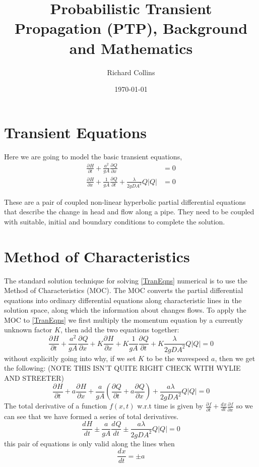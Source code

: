 \documentclass[]{article}
\date{\today}
\title{Probabilistic Transient Propagation (PTP), Background and Mathematics}
\author{Richard Collins}
\providecommand{\diff}[3]{\frac{d^{#3} #1}{d #2^{#3}}}
\providecommand{\pdiff}[3]{\frac{\partial^{#3} #1}{\partial #2^{#3}}}
\providecommand{\abs}[1]{\left \lvert#1\right \rvert}
\begin{document}
\maketitle

\begin{abstract}
 
\end{abstract}

\section{Transient Equations}
Here we are going to model the basic transient equations, 
\begin{equation}\label{TranEqns}
 \begin{split}
 \pdiff{H}{t}{} + \frac{a^2}{gA}\pdiff{Q}{x}{} &= 0 \\
\pdiff{H}{x}{} + \frac{1}{gA}\pdiff{Q}{t}{} + \frac{\lambda}{2 g DA^2}Q \abs{Q} &= 0
 \end{split}
\end{equation}

These are a pair of coupled non-linear hyperbolic partial differential equations that describe the change in head and flow along a pipe.
They need to be coupled with suitable, initial and boundary conditions to complete the solution.

\section{Method of Characteristics}
The standard solution technique for solving \eqref{TranEqns} numerical is to use the Method of Characteristics (MOC).  
The MOC converts the partial differential equations into ordinary differential equations along characteristic lines in the solution space, along which the information about changes flows.
To apply the MOC to \eqref{TranEqns} we first multiply the momentum equation by a currently unknown factor $K$, then add the two equations together:
\begin{equation}
 \pdiff{H}{t}{} + \frac{a^2}{gA}\pdiff{Q}{x}{} + K \pdiff{H}{x}{} + K \frac{1}{gA}\pdiff{Q}{t}{} + K \frac{\lambda}{2 g DA^2}Q \abs{Q} = 0
\end{equation}
without explicitly going into why, if we set $K$ to be the wavespeed $a$, then we get the following:  (NOTE THIS ISN'T QUITE RIGHT CHECK WITH WYLIE AND STREETER)
\begin{equation}
 \pdiff{H}{t}{} + a \pdiff{H}{x}{} + \frac{a}{gA}\left(\pdiff{Q}{t}{} + a \pdiff{Q}{x}{} \right) + \frac{a \lambda}{2 g DA^2}Q \abs{Q} = 0
\end{equation}
The total derivative of a function $f(x,t)$ w.r.t time is given by $\pdiff{f}{t}{} + \diff{x}{t}{}\pdiff{f}{x}{}$ so we can see that we have formed a series of total derivatives.
\begin{equation}
 \diff{H}{t}{} \pm \frac{a}{gA}\diff{Q}{t}{} \pm \frac{a \lambda}{2 g DA^2}Q \abs{Q} = 0
\end{equation}
this pair of equations is only valid along the lines when 
\begin{equation}
 \diff{x}{t}{} = \pm a
\end{equation}
\end{document}
